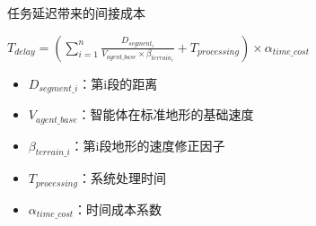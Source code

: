 \documentclass[
10pt,
aspectratio=169,
]{beamer}
\begin{document}
\begin{frame}
  \begin{alertblock}{任务延迟带来的间接成本}
 \end{alertblock}
 \begin{exampleblock}{}
$T_{delay} = \left(\sum_{i=1}^{n} \frac{D_{segment_i}}{V_{agent\_base} \times \beta_{terrain_i}} + T_{processing}\right) \times \alpha_{time\_cost}$
  \end{exampleblock}

 \begin{exampleblock}{}

                \begin{itemize}
				
                    \item $D_{segment\_i}$：第i段的距离
 \item $V_{agent\_base}$：智能体在标准地形的基础速度
 \item $β_{terrain\_i}$：第i段地形的速度修正因子
 \item $T_{processing}$：系统处理时间
 \item $α_{time\_cost}$：时间成本系数
	
		
                    
                \end{itemize}
            \end{exampleblock}

\end{frame}	
\end{document}

